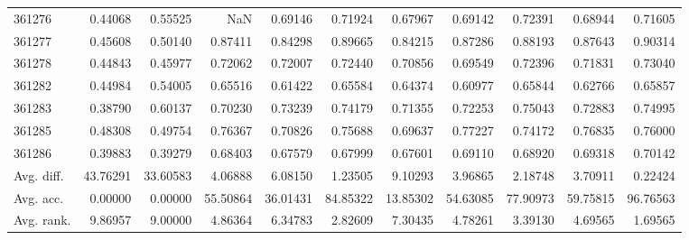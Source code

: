 \begin{tabular}{lrrrrrrrrrr}
361276 & 0.44068 & 0.55525 & NaN & 0.69146 & 0.71924 & 0.67967 & 0.69142 & 0.72391 & 0.68944 & 0.71605 \\
361277 & 0.45608 & 0.50140 & 0.87411 & 0.84298 & 0.89665 & 0.84215 & 0.87286 & 0.88193 & 0.87643 & 0.90314 \\
361278 & 0.44843 & 0.45977 & 0.72062 & 0.72007 & 0.72440 & 0.70856 & 0.69549 & 0.72396 & 0.71831 & 0.73040 \\
361282 & 0.44984 & 0.54005 & 0.65516 & 0.61422 & 0.65584 & 0.64374 & 0.60977 & 0.65844 & 0.62766 & 0.65857 \\
361283 & 0.38790 & 0.60137 & 0.70230 & 0.73239 & 0.74179 & 0.71355 & 0.72253 & 0.75043 & 0.72883 & 0.74995 \\
361285 & 0.48308 & 0.49754 & 0.76367 & 0.70826 & 0.75688 & 0.69637 & 0.77227 & 0.74172 & 0.76835 & 0.76000 \\
361286 & 0.39883 & 0.39279 & 0.68403 & 0.67579 & 0.67999 & 0.67601 & 0.69110 & 0.68920 & 0.69318 & 0.70142 \\
Avg. diff. & 43.76291 & 33.60583 & 4.06888 & 6.08150 & 1.23505 & 9.10293 & 3.96865 & 2.18748 & 3.70911 & 0.22424 \\
Avg. acc. & 0.00000 & 0.00000 & 55.50864 & 36.01431 & 84.85322 & 13.85302 & 54.63085 & 77.90973 & 59.75815 & 96.76563 \\
Avg. rank. & 9.86957 & 9.00000 & 4.86364 & 6.34783 & 2.82609 & 7.30435 & 4.78261 & 3.39130 & 4.69565 & 1.69565 \\
\bottomrule
\end{tabular}
